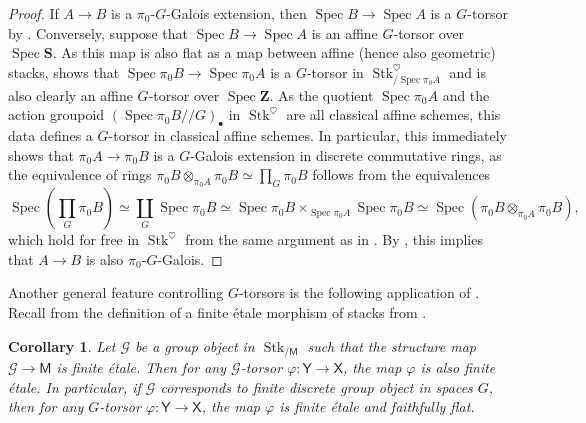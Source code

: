 \documentclass[11pt, a4paper]{article}
\DeclareMathOperator{\Spec}{Spec}
\newcommand{\1}{\mathbf{1}}
\newcommand{\Sph}{\mathbf{S}}
\DeclareMathOperator{\Stk}{Stk}
\newcommand{\calG}{\mathcal{G}}
\newcommand{\M}{\mathsf{M}}
\newcommand{\X}{\mathsf{X}}
\newcommand{\Y}{\mathsf{Y}}
\newcommand{\Z}{\mathbf{Z}}
\theoremstyle{plain}
\newtheorem{cor}[equation]{Corollary}
\theoremstyle{definition}
\theoremstyle{remark}\numberwithin{equation}{section}
\begin{document}
\begin{proof}
    If $A \to B$ is a $\pi_0$-$G$-Galois extension, then $\Spec B \to \Spec A$ is a $G$-torsor by . Conversely, suppose that $\Spec B \to \Spec A$ is an affine $G$-torsor over $\Spec \Sph$. As this map is also flat as a map between affine (hence also geometric) stacks,  shows that $\Spec \pi_0 B \to \Spec \pi_0 A$ is a $G$-torsor in $\Stk^\heartsuit_{/\Spec \pi_0 A}$ and is also clearly an affine $G$-torsor over $\Spec \Z$. As the quotient $\Spec \pi_0 A$ and the action groupoid $(\Spec \pi_0 B // G)_\bullet$ in $\Stk^\heartsuit$ are all classical affine schemes, this data defines a $G$-torsor in classical affine schemes. In particular, this immediately shows that $\pi_0 A \to \pi_0 B$ is a $G$-Galois extension in discrete commutative rings, as the equivalence of rings $\pi_0 B \otimes_{\pi_0 A} \pi_0 B \simeq \prod_G \pi_0 B$ follows from the equivalences
    \[\Spec \left(\prod_G \pi_0 B\right) \simeq \coprod_G \Spec \pi_0 B \simeq \Spec \pi_0 B \times_{\Spec \pi_0 A} \Spec \pi_0 B \simeq \Spec (\pi_0 B \otimes_{\pi_0 A} \pi_0 B),\]
    which hold for free in $\Stk^\heartsuit$ from the same argument as in . By \cite[Rmk.B.7.5.3]{sag}, this implies that $A \to B$ is also $\pi_0$-$G$-Galois.
\end{proof}

Another general feature controlling $G$-torsors is the following application of . Recall from the definition of a finite étale morphism of stacks from .

\begin{cor}\label{cor:finiteetaleness}
    Let $\calG$ be a group object in $\Stk_{/\M}$ such that the structure map $\calG \to \M$ is finite étale. Then for any $\calG$-torsor $\varphi \colon \Y \to \X$, the map $\varphi$ is also finite étale. In particular, if $\calG$ corresponds to finite discrete group object in spaces $G$, then for any $G$-torsor $\varphi \colon \Y \to \X$, the map $\varphi$ is finite étale and faithfully flat.
\end{cor}
\end{document}
